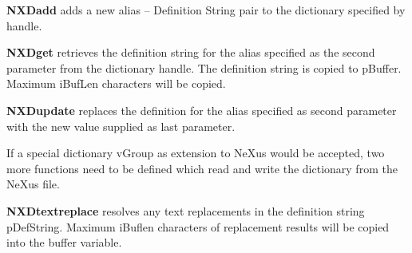 \documentclass[12pt]{article}
\begin{document}
  {\bf NXDadd} adds a new alias -- Definition String pair to the dictionary
  specified by handle.

  {\bf NXDget} retrieves the definition string for the alias specified as
  the second parameter from the dictionary handle. The definition string
  is copied to pBuffer. Maximum iBufLen characters will be copied.

  {\bf NXDupdate} replaces the definition for the alias specified as second
 parameter with the new value supplied as last parameter.
  
  If a special dictionary vGroup as extension to NeXus would be accepted,
  two more functions need to be defined which read and write the dictionary 
  from the NeXus file.

 {\bf NXDtextreplace} resolves any text replacements in the definition
 string pDefString. Maximum iBuflen characters of replacement results will
 be copied into the buffer variable. 
\end{document}
